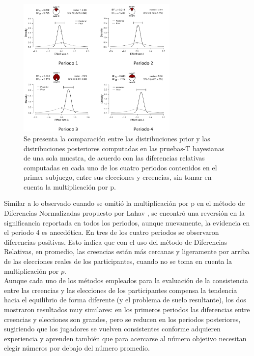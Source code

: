 \begin{figure}[th]
\centering
\includegraphics[width=0.70\textwidth]{Figures/Fig_4} 
\caption[Distribuciones prior y posterior de las Diferencias Relativas en el primer Subjuego, sin la multiplicación $\cdot p$ (prueba T bayesiana de una muestra)]{Se presenta la comparación entre las distribuciones prior y las distribuciones posteriores computadas en las pruebas-T bayesianas de una sola muestra, de acuerdo con las diferencias relativas computadas en cada uno de los cuatro periodos contenidos en el primer subjuego, entre sus elecciones y creencias, sin tomar en cuenta la multiplicación por p.}
\label{fig:DiferenciasRelativas_Subjuego1_NoP}
\end{figure}

Similar a lo observado cuando se omitió la multiplicación por p en el método de Diferencias Normalizadas propuesto por Lahav \parencite*{Lahav2015}, se encontró una reversión en la significancia reportada en todos los periodos, aunque nuevamente, la evidencia en el periodo 4 es anecdótica. En tres de los cuatro periodos se observaron diferencias positivas. Esto indica que con el uso del método de Diferencias Relativas, en promedio, las creencias están más cercanas y ligeramente por arriba de las elecciones reales de los participantes, cuando no se toma en cuenta la multiplicación por $p$.\\

Aunque cada uno de los métodos empleados para la evaluación de la consistencia entre las creencias y las elecciones de los participantes compensa la tendencia hacia el equilibrio de forma diferente (y el problema de suelo resultante), los dos mostraron resultados muy similares: en los primeros periodos las diferencias entre creencias y elecciones son grandes, pero se reducen en los periodos posteriores, sugiriendo que los jugadores se vuelven consistentes conforme adquieren experiencia y aprenden también que para acercarse al número objetivo necesitan elegir números por debajo del número promedio.\\

